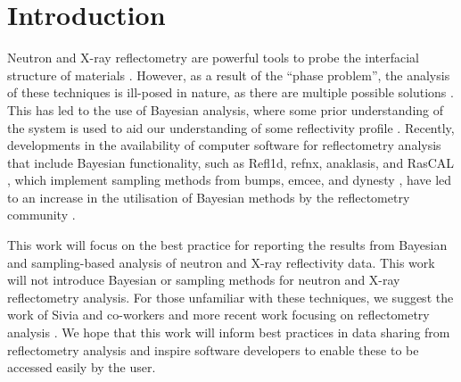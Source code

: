 \documentclass[reprint,superscriptaddress,aps,amsmath,linenumbers]{revtex4-2}
\begin{document}
\maketitle

\section{Introduction}
\label{sec:intro}

Neutron and X-ray reflectometry are powerful tools to probe the interfacial structure of materials \cite{lovell_analysis_1999}.
However, as a result of the ``phase problem'', the analysis of these techniques is ill-posed in nature, as there are multiple possible solutions \cite{majkrzak_exact_1995}.
This has led to the use of Bayesian analysis, where some prior understanding of the system is used to aid our understanding of some reflectivity profile \cite{sivia_analysis_1991,geoghegan_experimental_1996,sivia_bayesian_1998}.
Recently, developments in the availability of computer software for reflectometry analysis that include Bayesian functionality, such as Refl1d, refnx, anaklasis, and RasCAL \cite{kienzle_refl1d_2021,nelson_refnx_2019,koutsioubas_anaklasis_2021,hughes_rascal_2019}, which implement sampling methods from bumps, emcee, and dynesty \cite{kienzle_bumps_2021,foremanmackey_emcee_2019,speagle_dynesty_2020}, have led to an increase in the utilisation of Bayesian methods by the reflectometry community \cite{mccluskey_bayesian_2019,mccluskey_general_2020}.

This work will focus on the best practice for reporting the results from Bayesian and sampling-based analysis of neutron and X-ray reflectivity data. 
This work will not introduce Bayesian or sampling methods for neutron and X-ray reflectometry analysis. For those unfamiliar with these techniques, we suggest the work of Sivia and co-workers \cite{sivia_bayesian_1998,sivia_data_2006} and more recent work focusing on reflectometry analysis \cite{hughes_physical_2019,mccluskey_general_2020,nelson_refnx_2019,aboljadayel_determining_2021}. 
We hope that this work will inform best practices in data sharing from reflectometry analysis and inspire software developers to enable these to be accessed easily by the user. 
\end{document}
